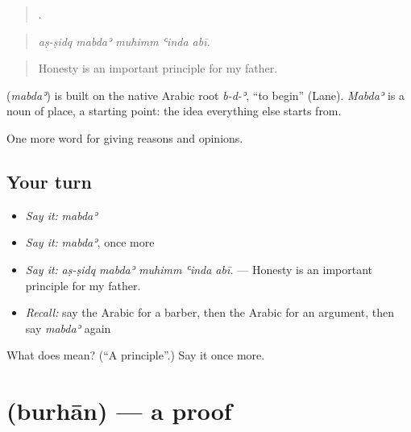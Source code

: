 \begin{quote}
    .
\end{quote}

\begin{quote}
\emph{aṣ-ṣidq mabdaʾ muhimm ʿinda abī.}
\end{quote}

\begin{quote}
Honesty is an important principle for my father.
\end{quote}

\begin{cousinweb}
\textbf{} (\emph{mabdaʾ}) is built on the native Arabic root \emph{b-d-ʾ}, \textquotedblleft{}to begin\textquotedblright{} (Lane). \emph{Mabdaʾ} is a noun of place, a starting point: the idea everything else starts from.
\end{cousinweb}

\begin{grammarlens}[title={What you've built}]
One more word for giving reasons and opinions.
\end{grammarlens}

\subsection*{Your turn}
\begin{itemize}
\raggedright
  \item \emph{Say it:} \emph{mabdaʾ}
  \item \emph{Say it:} \emph{mabdaʾ}, once more
  \item \emph{Say it:} \emph{aṣ-ṣidq mabdaʾ muhimm ʿinda abī.} — Honesty is an important principle for my father.
  \item \emph{Recall:} say the Arabic for a barber, then the Arabic for an argument, then say \emph{mabdaʾ} again
\end{itemize}

\begin{tcolorbox}[breakable,colback=teal!4,colframe=teal!35!black,title={Before you move on}]
What does  mean? (\textquotedblleft{}A principle\textquotedblright{}.) Say it once more.
\end{tcolorbox}
\section[\texorpdfstring{\ar{برهان} (burhān)}{برهان (burhān)}]{ (burhān) — a proof}

